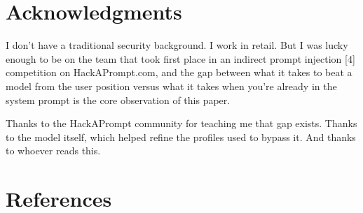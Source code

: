 \documentclass[11pt,a4paper]{article}
\let\oldsection\section
\renewcommand{\section}{\needspace{5\baselineskip}\oldsection}
\begin{document}
\section*{Acknowledgments}

I don't have a traditional security background. I work in retail. But I was lucky enough to be on the team that took first place in an indirect prompt injection [4] competition on HackAPrompt.com, and the gap between what it takes to beat a model from the user position versus what it takes when you're already in the system prompt is the core observation of this paper.

Thanks to the HackAPrompt community for teaching me that gap exists. Thanks to the model itself, which helped refine the profiles used to bypass it. And thanks to whoever reads this.

\vspace{1em}
\section*{References}
\end{document}

